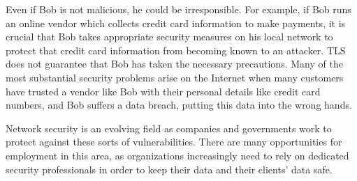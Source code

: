 Even if Bob is not malicious, he could be irresponsible. For example, if Bob runs an online vendor which collects credit card information to make payments, it is crucial that Bob takes appropriate security measures on his local network to protect that credit card information from becoming known to an attacker. TLS does not guarantee that Bob has taken the necessary precautions. Many of the most substantial security problems arise on the Internet when many customers have trusted a vendor like Bob with their personal details like credit card numbers, and Bob suffers a data breach, putting this data into the wrong hands.

Network security is an evolving field as companies and governments work to protect against these sorts of vulnerabilities. There are many opportunities for employment in this area, as organizations increasingly need to rely on dedicated security professionals in order to keep their data and their clients' data safe.